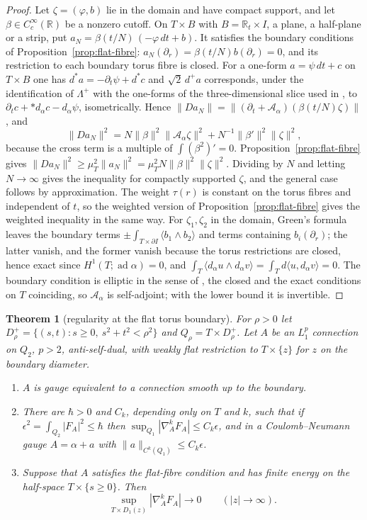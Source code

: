 \documentclass[11pt]{amsart}
\newtheorem{theorem}{Theorem}[section]
\theoremstyle{definition}
\theoremstyle{remark}
\theoremstyle{plain}
\numberwithin{equation}{section}
\newcommand{\RR}{\mathbb{R}}
\newcommand{\ad}{\operatorname{ad}}
\begin{document}
\begin{proof}
Let $\zeta=(\varphi,b)$ lie in the domain and have compact support, and let
$\beta\in C^\infty_c(\RR)$ be a nonzero cutoff. On $T\times B$ with
$B=\RR_t\times I$, a plane, a half-plane or a strip, put
$a_N=\beta(t/N)\,(-\varphi\,dt+b)$. It satisfies the boundary conditions of
Proposition~\ref{prop:flat-fibre}: $a_N(\partial_r)=\beta(t/N)b(\partial_r)=0$,
and its restriction to each boundary torus fibre is closed. For a one-form
$a=\psi\,dt+c$ on $T\times B$ one has $d^*a=-\partial_t\psi+d^*c$ and
$\sqrt2\,d^+a$ corresponds, under the identification of $\Lambda^+$ with the
one-forms of the three-dimensional slice used in \cite[(4.16)]{DFL}, to
$\partial_tc+*d_\alpha c-d_\alpha\psi$, isometrically. Hence
$\|Da_N\|=\|(\partial_t+\mathcal A_\alpha)(\beta(t/N)\zeta)\|$, and
\[
\|Da_N\|^2=N\|\beta\|^2\|\mathcal A_\alpha\zeta\|^2+N^{-1}\|\beta'\|^2\|\zeta\|^2,
\]
because the cross term is a multiple of $\int(\beta^2)'=0$. Proposition~\ref{prop:flat-fibre}
gives $\|Da_N\|^2\ge\mu_T^2\|a_N\|^2=\mu_T^2N\|\beta\|^2\|\zeta\|^2$. Dividing by $N$
and letting $N\to\infty$ gives the inequality for compactly supported $\zeta$, and
the general case follows by approximation. The weight $\tau(r)$ is constant on
the torus fibres and independent of $t$, so the weighted version of
Proposition~\ref{prop:flat-fibre} gives the weighted inequality in the same way.
For $\zeta_1,\zeta_2$ in the domain, Green's formula leaves the boundary terms
$\pm\int_{T\times\partial I}\langle b_1\wedge b_2\rangle$ and terms containing
$b_i(\partial_r)$; the latter vanish, and the former vanish because the torus
restrictions are closed, hence exact since $H^1(T;\ad\alpha)=0$, and
$\int_T\langle d_\alpha u\wedge d_\alpha v\rangle=\int_Td\langle u,d_\alpha v\rangle=0$.
The boundary condition is elliptic in the sense of \cite{BB}, the closed and the
exact conditions on $T$ coinciding, so $\mathcal A_\alpha$ is self-adjoint; with
the lower bound it is invertible.
\end{proof}

\begin{theorem}[regularity at the flat torus boundary]\label{thm:flat-boundary-regularity}
For $\rho>0$ let $D^+_\rho=\{(s,t):s\ge0,\ s^2+t^2<\rho^2\}$ and
$Q_\rho=T\times D^+_\rho$. Let $A$ be an $L^p_1$ connection on $Q_2$, $p>2$,
anti-self-dual, with weakly flat restriction to $T\times\{z\}$ for $z$ on the
boundary diameter.
\begin{enumerate}[label=(\alph*)]
\item $A$ is gauge equivalent to a connection smooth up to the boundary.
\item There are $\hbar>0$ and $C_k$, depending only on $T$ and $k$, such that if
  $\epsilon^2=\int_{Q_2}|F_A|^2\le\hbar$ then $\sup_{Q_1}|\nabla^k_AF_A|\le C_k\epsilon$,
  and in a Coulomb--Neumann gauge $A=\alpha+a$ with $\|a\|_{C^k(Q_1)}\le C_k\epsilon$.
\item Suppose that $A$ satisfies the flat-fibre condition and has finite
  energy on the half-space $T\times\{s\ge0\}$. Then
  \[
  \sup_{T\times D_1(z)}|\nabla^k_AF_A|\longrightarrow0\qquad(|z|\to\infty).
  \]
\end{enumerate}
\end{theorem}
\end{document}
